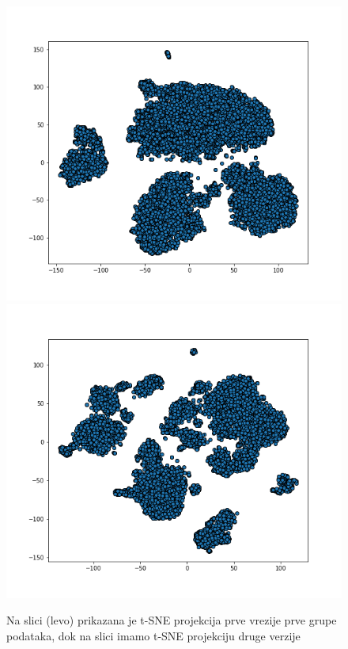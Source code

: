 \documentclass[a4paper]{article}
\begin{document}
\begin{figure}[H]
	\centering
	\includegraphics[scale=0.3]{tsne1}
	\includegraphics[scale=0.3]{hvg_tsne}
	\caption{Na slici (levo) prikazana je t-SNE projekcija prve vrezije prve grupe podataka, dok na slici imamo t-SNE projekciju druge verzije}
	\label{tsne_obe_verzije}
\end{figure}
\end{document}
